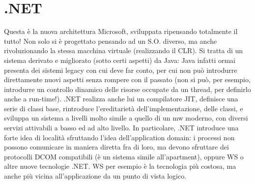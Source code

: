 \section{.NET}
Questa è la nuova architettura Microsoft, sviluppata ripensando totalmente il tutto! Non solo si è progettato pensando
ad un S.O. diverso, ma anche rivoluzionando la stessa macchina virtuale (realizzando il CLR). Si tratta di un sistema
derivato e migliorato (sotto certi aspetti) da Java: Java infatti ormai presenta dei sistemi legacy con cui deve far
conto, per cui non può introdurre direttamente nuovi aspetti senza rompere con il passato (non si può, per esempio,
introdurre un controllo dinamico delle risorse occupate da un thread, per definirlo anche a run-time!). .NET realizza
anche lui un compilatore JIT, definisce una serie di classi base, rintroduce l'ereditarietà dell'implementazione, delle
classi, e sviluppa un sistema a livelli molto simile a quello di un mw moderno, con diversi servizi attivabili a basso
ed ad alto livello.
In particolare, .NET introduce una forte idea di località sfruttando l'idea dell'application domain: i processi non
possono comunicare in maniera diretta fra di loro, ma devono sfruttare dei protocolli DCOM compatibili (è un sistema
simile all'apartment), oppure WS o altre nuove tecnologie .NET. WS per esempio è la tecnologia più costosa, ma anche più
vicina all'applicazione da un punto di vista logico.
